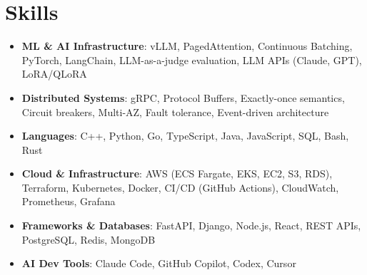 \documentclass[letterpaper,11pt]{article}
\newcommand{\resumeSubHeadingListStart}{\begin{itemize}[leftmargin=0.15in, label={}]}
\newcommand{\resumeSubHeadingListEnd}{\end{itemize}}
\newcommand{\resumeSkillHeading}[2]{%
  \item\small{\textbf{#1}: #2 \vspace{-9pt}}%
}
\begin{document}
\section{Skills}
  \resumeSubHeadingListStart
    \resumeSkillHeading{ML \& AI Infrastructure}{vLLM, PagedAttention, Continuous Batching, PyTorch, LangChain, LLM-as-a-judge evaluation, LLM APIs (Claude, GPT), LoRA/QLoRA}
    \resumeSkillHeading{Distributed Systems}{gRPC, Protocol Buffers, Exactly-once semantics, Circuit breakers, Multi-AZ, Fault tolerance, Event-driven architecture}
    \resumeSkillHeading{Languages}{C++, Python, Go, TypeScript, Java, JavaScript, SQL, Bash, Rust}
    \resumeSkillHeading{Cloud \& Infrastructure}{AWS (ECS Fargate, EKS, EC2, S3, RDS), Terraform, Kubernetes, Docker, CI/CD (GitHub Actions), CloudWatch, Prometheus, Grafana}
    \resumeSkillHeading{Frameworks \& Databases}{FastAPI, Django, Node.js, React, REST APIs, PostgreSQL, Redis, MongoDB}
    \resumeSkillHeading{AI Dev Tools}{Claude Code, GitHub Copilot, Codex, Cursor}
  \resumeSubHeadingListEnd
\end{document}
